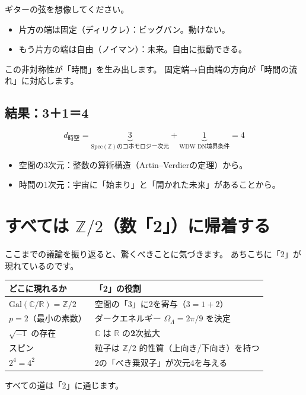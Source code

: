 \documentclass[12pt,a4paper]{article}
\begin{document}
\begin{analogy}[ロープのアナロジー]
ギターの弦を想像してください。
\begin{itemize}
  \item 片方の端は固定（ディリクレ）：ビッグバン。動けない。
  \item もう片方の端は自由（ノイマン）：未来。自由に振動できる。
\end{itemize}
この非対称性が「時間」を生み出します。
固定端→自由端の方向が「時間の流れ」に対応します。
\end{analogy}

\subsection{結果：3＋1＝4}

\begin{keypoint}[時空次元の公式]
\[
  d_{\text{時空}} = \underbrace{3}_{\mathrm{Spec}(\mathbb{Z})\text{のコホモロジー次元}}
  + \underbrace{1}_{\text{WDW DN境界条件}} = 4
\]
\begin{itemize}
  \item 空間の3次元：整数の算術構造（Artin--Verdierの定理）から。
  \item 時間の1次元：宇宙に「始まり」と「開かれた未来」があることから。
\end{itemize}
\end{keypoint}

\section{すべては $\mathbb{Z}/2$（数「2」）に帰着する}

ここまでの議論を振り返ると、驚くべきことに気づきます。
あちこちに「2」が現れているのです。

\begin{keypoint}[「2」の遍在性]
\begin{center}
\renewcommand{\arraystretch}{1.3}
\begin{tabular}{p{6cm}l}
\toprule
\textbf{どこに現れるか} & \textbf{「2」の役割} \\
\midrule
$\mathrm{Gal}(\mathbb{C}/\mathbb{R}) = \mathbb{Z}/2$ &
空間の「3」に2を寄与（$3=1+2$）\\
\addlinespace
$p = 2$（最小の素数）&
ダークエネルギー $\Omega_\Lambda = 2\pi/9$ を決定 \\
\addlinespace
$\sqrt{-1}$ の存在 &
$\mathbb{C}$ は $\mathbb{R}$ の\textbf{2}次拡大 \\
\addlinespace
スピン &
粒子は $\mathbb{Z}/2$ 的性質（上向き/下向き）を持つ \\
\addlinespace
$2^4 = 4^2$ &
2の「べき乗双子」が次元4を与える \\
\bottomrule
\end{tabular}
\end{center}

すべての道は「2」に通じます。
\end{keypoint}
\end{document}
